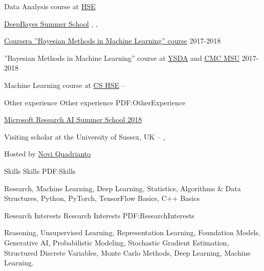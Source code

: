 \documentclass[letterpaper,MMMyyyy,nonstopmode]{simpleresumecv}
\begin{document}
\begin{Body}
\Entry
Data Analysis course at \href{https://cs.hse.ru/en/}{HSE}
\hfill
{}
\Gap

\Entry
\href{http://deepbayes.ru}{DeepBayes Summer School}
\hfill
{}, , 
\Gap

\Entry
\href{https://www.coursera.org/learn/bayesian-methods-in-machine-learning}
{Coursera ”Bayesian Methods in Machine Learning” course}
\hfill
2017-2018
\Gap

\Entry
”Bayesian Methods in Machine Learning” course at \href{https://yandexdataschool.com}{YSDA}
and \href{https://cs.msu.ru/en}{CMC MSU}
\hfill
2017-2018
\Gap

\Entry
Machine Learning course at \href{https://cs.hse.ru/en/}{CS HSE}
\hfill
{} --
\Gap


\Section
{Other experience}
{Other experience}
{PDF:OtherExperience}

\Entry
\href{https://www.microsoft.com/en-us/research/event/ai-summer-school-2018/}{Microsoft Research AI Summer School 2018}
\hfill
{}
\Gap

\Entry
Visiting scholar at the University of Sussex, UK
\hfill
{} --
, 
\begin{Detail}
Hosted by \href{http://www.sussex.ac.uk/profiles/335583}{Novi Quadrianto} \hfil
\end{Detail}


\Section
{Skills}
{Skills}
{PDF:Skills}

\Entry Research, Machine Learning, Deep Learning, Statistics, Algorithms \& Data Structures, Python, PyTorch, TensorFlow Basics, C++ Basics



\Section
{Research Interests}
{Research Interests}
{PDF:ResearchInterests}

\Entry Reasoning, Unsupervised Learning, Representation Learning, Foundation Models, Generative AI, Probabilistic Modeling, Stochastic Gradient Estimation, Structured Discrete Variables, Monte Carlo Methods, Deep Learning, Machine Learning.


\iffalse


\end{Body}
\end{document}
